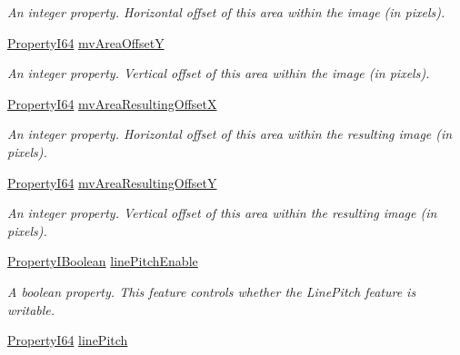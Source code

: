\begin{DoxyCompactItemize}
\begin{DoxyCompactList}\small\item\em An integer property. Horizontal offset of this area within the image (in pixels). \end{DoxyCompactList}\item 
\hyperlink{group___common_interface_ga81749b2696755513663492664a18a893}{Property\+I64} \hyperlink{classmv_i_m_p_a_c_t_1_1acquire_1_1_gen_i_cam_1_1_image_format_control_a413bde6385d3cdf6265e7bf2dabe2fd6}{mv\+Area\+Offset\+Y}
\begin{DoxyCompactList}\small\item\em An integer property. Vertical offset of this area within the image (in pixels). \end{DoxyCompactList}\item 
\hyperlink{group___common_interface_ga81749b2696755513663492664a18a893}{Property\+I64} \hyperlink{classmv_i_m_p_a_c_t_1_1acquire_1_1_gen_i_cam_1_1_image_format_control_ada77ff6906f66a517387bb52d7fb755f}{mv\+Area\+Resulting\+Offset\+X}
\begin{DoxyCompactList}\small\item\em An integer property. Horizontal offset of this area within the resulting image (in pixels). \end{DoxyCompactList}\item 
\hyperlink{group___common_interface_ga81749b2696755513663492664a18a893}{Property\+I64} \hyperlink{classmv_i_m_p_a_c_t_1_1acquire_1_1_gen_i_cam_1_1_image_format_control_a6df2ff8dd4593af0221154f44878f7fd}{mv\+Area\+Resulting\+Offset\+Y}
\begin{DoxyCompactList}\small\item\em An integer property. Vertical offset of this area within the resulting image (in pixels). \end{DoxyCompactList}\item 
\hyperlink{group___common_interface_ga44f9437e24b21b6c93da9039ec6786aa}{Property\+I\+Boolean} \hyperlink{classmv_i_m_p_a_c_t_1_1acquire_1_1_gen_i_cam_1_1_image_format_control_a96cf918c428ca52a9c1f7f8b481ab2bf}{line\+Pitch\+Enable}
\begin{DoxyCompactList}\small\item\em A boolean property. This feature controls whether the Line\+Pitch feature is writable. \end{DoxyCompactList}\item 
\hyperlink{group___common_interface_ga81749b2696755513663492664a18a893}{Property\+I64} \hyperlink{classmv_i_m_p_a_c_t_1_1acquire_1_1_gen_i_cam_1_1_image_format_control_a709a0ec40bef18f6a7a57d17b7a1fb72}{line\+Pitch}

\end{DoxyCompactItemize}
